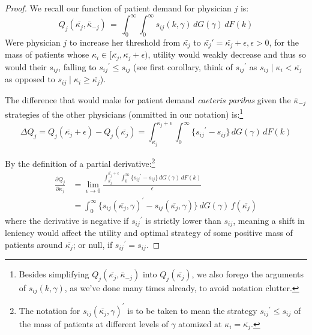 \documentclass[../main.tex]{subfiles}
\begin{document}
\begin{proof}
We recall our function of patient demand for physician $j$ is:
    \[
    Q_j(\bar{\kappa_j}, \bar{\kappa}_{-j}) \,=\, \int_{0}^{\infty} \int_{0}^{\infty} s_{ij} (k, \gamma) \,dG(\gamma) \,dF(k) 
    \]
Were physician $j$ to increase her threshold from $\bar{\kappa_j}$ to $\bar{\kappa_j}' = \bar{\kappa_j} + \epsilon, \epsilon > 0$, for the mass of patients whose $\kappa_i \in [\bar{\kappa_j}, \bar{\kappa_j} + \epsilon)$, utility would weakly decrease and thus so would their $s_{ij}$, falling to ${s_{ij}}^{\prime} \leq s_{ij}$ (see first corollary, think of ${s_{ij}}^{\prime}$ as $s_{ij} \mid \kappa_i < \bar{\kappa_j}$ as opposed to $s_{ij} \mid \kappa_i \geq \bar{\kappa_j}$).

The difference that would make for patient demand \textit{caeteris paribus} given the $\bar{\kappa}_{-j}$ strategies of the other physicians (ommitted in our notation) is:\footnote{Besides simplifying $Q_j(\bar{\kappa_j}, \bar{\kappa}_{-j})$ into $Q_j(\bar{\kappa_j})$, we also forego the arguments of $s_{ij} (k, \gamma)$, as we've done many times already, to avoid notation clutter. }
\[
\Delta Q_j = Q_j(\bar{\kappa_j} + \epsilon) - Q_j(\bar{\kappa_j})=\int_{\bar{\kappa_j}}^{\bar{\kappa_j} + \epsilon} \int_{0}^{\infty} \{ {s_{ij}}^{\prime} - s_{ij}\} \,dG(\gamma) \,dF(k)
\]

By the definition of a partial derivative:\footnote{The notation for ${s_{ij}} (\bar{\kappa_j}, \gamma)^{\prime}$ is to be taken to mean the strategy ${s_{ij}}^{\prime} \leq s_{ij}$ of the mass of patients at different levels of $\gamma$ atomized at $\kappa_i = \bar{\kappa_j}$.}
\begin{align*}
    \frac{\partial Q_{j}}{\partial\bar{\kappa_{j}}} & = \lim_{\epsilon \rightarrow 0} \frac{\int_{\bar{\kappa_j}}^{\bar{\kappa_j} + \epsilon} \int_{0}^{\infty} \{ {s_{ij}}^{\prime} - s_{ij}\} \,dG(\gamma) \,dF(k)}{\epsilon} \\
    & = \int_{0}^{\infty} \{ {s_{ij}} (\bar{\kappa_j}, \gamma)^{\prime} - s_{ij} (\bar{\kappa_j}, \gamma)\} \,dG(\gamma) \,f(\bar{\kappa_j}) 
\end{align*}
where the derivative is negative if ${s_{ij}}^{\prime}$ is strictly lower than $s_{ij}$, meaning a shift in leniency would affect the utility and optimal strategy of some positive mass of patients around $\bar{\kappa_j}$; or null, if ${s_{ij}}^{\prime} = s_{ij}$.


\end{proof}
\end{document}
